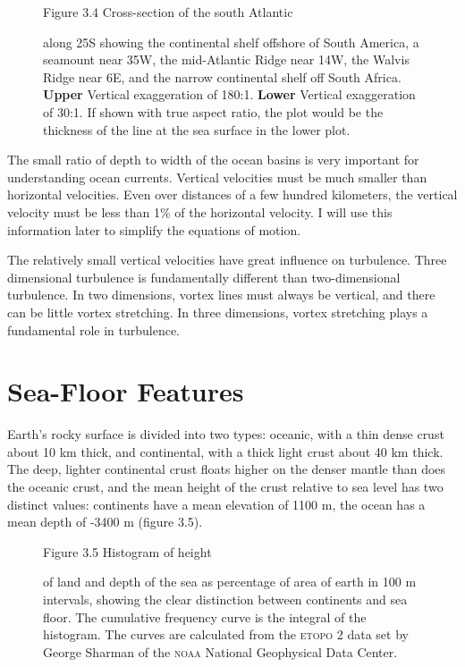 \begin{figure}[t!]
\footnotesize
Figure 3.4 Cross-section of the south Atlantic\rule{0pt}{3ex} along 25\degrees S
showing the continental shelf offshore of South America, a seamount near
35\degrees W, the mid-Atlantic Ridge near 14\degrees W, the Walvis Ridge
near 6\degrees E, and the narrow continental shelf off South Africa.
\textbf{Upper} Vertical exaggeration of 180:1. \textbf{Lower} Vertical
exaggeration of 30:1. If shown with true aspect ratio, the plot would be the
thickness of the line at the sea surface in the lower plot.
\label{fig:bathy}
\vspace{-4ex}
\end{figure}

The small ratio of depth to width of the ocean basins is very important for understanding ocean currents. Vertical velocities must be much smaller than horizontal velocities. Even over distances of a few hundred kilometers, the vertical velocity must be less than 1\% of the horizontal velocity. I will use this information later to simplify the equations of motion.

The relatively small vertical velocities have great influence on
turbulence. Three dimensional turbulence is fundamentally
different than two-dimensional turbulence. In two dimensions,
vortex lines must always be vertical, and there can be little vortex stretching. In three
dimensions, vortex stretching plays a fundamental role in turbulence.

\section{Sea-Floor Features}
Earth's rocky surface is divided into two types: oceanic, with a thin
dense crust about 10 km thick, and continental, with a thick light crust about
40 km thick. The deep, lighter continental crust floats higher on the denser
mantle than does the oceanic crust, and the mean height of the crust relative to
sea level has two distinct values: continents have a mean elevation of 1100 m, the
ocean has a mean depth of -3400 m (figure 3.5).

\begin{figure}[t!]
\footnotesize
Figure 3.5 Histogram of height\rule{0pt}{3ex} of land and depth of the sea as percentage of area of earth in 100 m intervals, showing the clear distinction between continents and sea floor. The cumulative frequency curve is the integral of the histogram. The curves are calculated from the \textsc{etopo} 2 data set by George Sharman of the \textsc{noaa} National Geophysical Data Center. 
\label{fig:depth-r}
\vspace{-3ex}
\end{figure}

